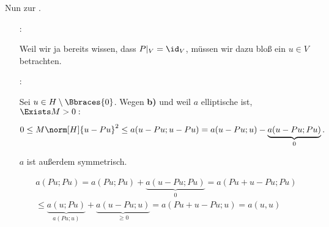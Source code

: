 \begin{solution}
\begin{enumerate}[label = \textbf{\alph*)}]
  Nun zur .

  \begin{itemize}

    \item
    [\Quote{$\geq$}:]

    Weil wir ja bereits wissen, dass $P|_V = \id_V$, müssen wir dazu bloß ein $u \in V$ betrachten.

    \item
    [\Quote{$\leq$}:]

    Sei $u \in H \setminus \Bbraces{0}$.
    Wegen \textbf{b)} und weil $a$ elliptische ist, $\Exists M > 0:$

    \begin{align*}
      0 \leq M \norm[H]{u - Pu}^2
      \leq
      a(u - Pu; u - Pu)
      =
      a(u - Pu; u)
      -
      \underbrace{a(u - Pu; Pu)}_0.
    \end{align*}

    $a$ ist außerdem symmetrisch.

    \begin{multline*}
      a(Pu; Pu)
      =
      a(Pu; Pu)
      +
      \underbrace{a(u - Pu; Pu)}_0
      =
      a(Pu + u - Pu; Pu) \\
      \leq
      \underbrace{a(u; Pu)}_{a(Pu; u)}
      +
      \underbrace{a(u - Pu; u)}_{\geq 0}
      =
      a(Pu + u - Pu; u)
      =
      a(u, u)
    \end{multline*}

  \end{itemize}

\end{enumerate}

\end{solution}

